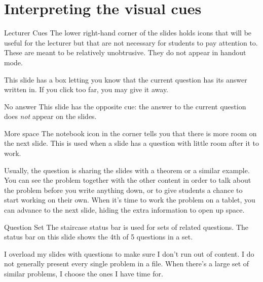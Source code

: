 \documentclass[10pt]{beamer}
\begin{document}
\section{Interpreting the visual cues}
\frame{\tableofcontents[currentsection]}
\begin{frame}{Lecturer Cues}
The lower right-hand corner of the slides  holds icons that will be useful for the lecturer but that are not necessary for students to pay attention to. These are meant to be relatively unobtrusive. They do not appear in handout mode.
\vfill

This slide has a box letting you know that the current question has its answer written in. If you click too far, you may give it away.
\AnswerYes
\end{frame}
\begin{frame}{No answer}
This slide has the opposite cue: the answer to the current question does \textit{not} appear on the slides. 
\AnswerNo
\end{frame}
\begin{frame}{More space}
The notebook icon in the corner tells you that there is more room on the next slide.
This is used when a slide has a question with little room after it to work.
\vfill

Usually, the question is sharing the slides with a theorem or a similar example.
You can see the problem together with the other content in order to talk about the problem before you write anything down, or to give students a chance to start working on their own. When it's time to work the problem on a tablet, you can advance to the next slide, hiding the extra information to open up space.
\MoreSpace
\end{frame}
\begin{frame}{Question Set}
The staircase status bar is used for sets of related questions. The status bar on this slide shows the 4th of 5 questions in a set.\vfill
{}

I overload my slides with questions to make sure I don't run out of content. \alert{I do not generally present every single problem in a file.} When there's a large set of similar problems, I choose the ones I have time for.
\end{frame}
\end{document}

